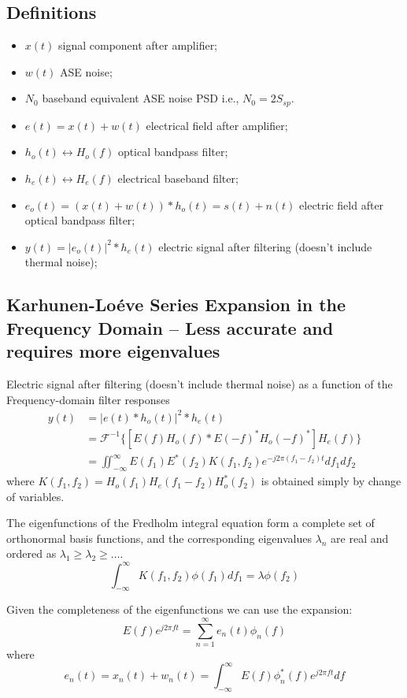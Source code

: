 \documentclass[a4paper]{article}
\begin{document}
\subsection{Definitions}
\begin{itemize}
	\item $x(t)$ signal component after amplifier;
	\item $w(t)$ ASE noise;
	\item $N_0$ baseband equivalent ASE noise PSD i.e., $N_0 = 2S_{sp}$.
	\item $e(t) = x(t) + w(t)$ electrical field after amplifier;
	\item $h_o(t) \leftrightarrow H_o(f)$ optical bandpass filter;
	\item $h_e(t) \leftrightarrow H_e(f)$ electrical baseband filter;
	\item $e_o(t) = (x(t) + w(t))\ast h_o(t) = s(t) + n(t)$ electric field after  optical bandpass filter;
	\item $y(t) = |e_o(t)|^2\ast h_e(t)$ electric signal after filtering (doesn't include thermal noise);
\end{itemize}

\subsection{Karhunen-Loéve Series Expansion in the Frequency Domain -- Less accurate and requires more eigenvalues}
Electric signal after filtering (doesn't include thermal noise) as a function of the Frequency-domain filter responses
\begin{align} \nonumber
y(t) &= |e(t)\ast h_o(t)|^2\ast h_e(t) \\ \nonumber
& = \mathcal{F}^{-1}\{[E(f)H_o(f)\ast E(-f)^*H_o(-f)^*]H_e(f)\} \\
& = \iint_{-\infty}^{\infty} E(f_1)E^*(f_2)K(f_1, f_2)e^{-j2\pi(f_1-f_2)t}df_1df_2
\end{align}
where $K(f_1, f_2) = H_o(f_1)H_e(f_1-f_2)H_o^*(f_2)$ is obtained simply by change of variables.

The eigenfunctions of the Fredholm integral equation form a complete set of orthonormal basis functions, and the corresponding eigenvalues $\lambda_n$ are real and ordered as $\lambda_1 \geq \lambda_2 \geq \ldots$.
\begin{equation}
\int_{-\infty}^{\infty} K(f_1, f_2)\phi(f_1)df_1 = \lambda\phi(f_2)
\end{equation}

Given the completeness of the eigenfunctions we can use the expansion:
\begin{equation}
E(f)e^{j2\pi ft} = \sum_{n=1}^{\infty}e_n(t)\phi_n(f)
\end{equation}
where 
\begin{equation}
e_n(t) = x_n(t) + w_n(t) = \int_{-\infty}^{\infty}E(f)\phi^*_n(f)e^{j2\pi ft}df
\end{equation}
\end{document}
